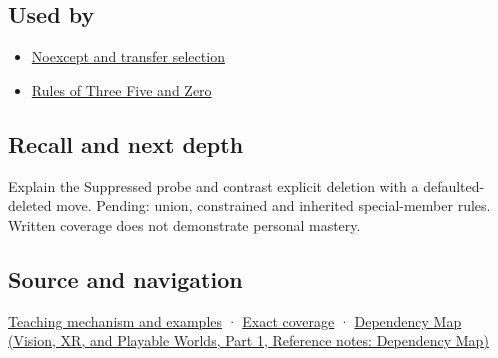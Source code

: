 \subsection{Used by}\label{appendix-42e02a12c694-used-by}

\hypertarget{appendix-42e02a12c694-used-by}{}

\begin{itemize}
\tightlist
\item
  \hyperref[appendix-c746afaa47d1]{Noexcept and transfer selection}
\item
  \hyperref[appendix-7679107d057e]{Rules of Three Five and Zero}
\end{itemize}

\subsection{Recall and next depth}\label{appendix-42e02a12c694-recall-and-next-depth}

\hypertarget{appendix-42e02a12c694-recall-and-next-depth}{}

Explain the Suppressed probe and contrast explicit deletion with a defaulted-deleted move. Pending: union, constrained and inherited special-member rules. Written coverage does not demonstrate personal mastery.

\subsection{Source and navigation}\label{appendix-42e02a12c694-source-and-navigation}

\hypertarget{appendix-42e02a12c694-source-and-navigation}{}

\hyperref[01-foundations-i-ch003-let-the-compiler-compose-the-operations]{Teaching mechanism and examples} · \hyperref[appendix-fd090d982a15-m009---parts-127-147]{Exact coverage} · \href{../07-Vision-XR-and-Playable-Worlds-P01/main.pdf\#appendix-4ad47bdd269a}{Dependency Map (Vision, XR, and Playable Worlds, Part 1, Reference notes: Dependency Map)}
